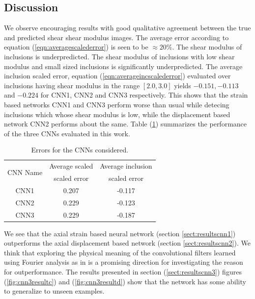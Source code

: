 \documentclass[12pt]{article}
\begin{document}
\subsection{\label{sect:discussion}Discussion}
We observe encouraging results with good qualitative agreement between the true and predicted shear shear modulus images. The average error according to equation (\ref{eqn:averagescalederror}) is seen to be $\approx{20\%}$. The shear modulus of inclusions is underpredicted. The shear modulus of inclusions with low shear modulus and small sized inclusions is significantly underpredicted. The average inclusion scaled error, equation (\ref{eqn:averageincscalederror}) evaluated over inclusions having shear modulus in the range $[2.0,3.0]$ yields $-0.151,-0.113$ and $-0.224$ for CNN1, CNN2 and CNN3 respectively. This shows that the strain based networks CNN1 and CNN3 perform worse than usual while detecing inclusions which whose shear modulus is low, while the displacement based network CNN2 performs about the same. Table (\ref{table:cnnstatsummary}) summarizes the performance of the three CNNs evaluated in this work. 


\begin{table}
  \centering
  \begin{tabular}{|c|c|c|}
    \hline
    \multirow{2}{*}{CNN Name} & Average scaled & Average inclusion \\
                              & scaled error   & scaled error      \\
    \hline
    CNN1     & 0.207 & -0.117\\
    \hline
    CNN2     & 0.229 & -0.123\\
    \hline
    CNN3     & 0.229 & -0.187\\
    \hline
  \end{tabular}
  \caption{\label{table:cnnstatsummary} Errors for the CNNs considered.}
\end{table}  

We see that the axial strain based neural network (section {\ref{sect:resultscnn1}}) outperforms the axial displacement based network (section \ref{sect:resultscnn2}). We think that exploring the physical meaning of the convolutional filters learned using Fourier analysis as in \cite{paper:pateloberai2019} is a promising direction for investigating the reason for outperformance. The results presented in section (\ref{sect:resultscnn3}) figures (\ref{fig:cnn3resultc}) and (\ref{fig:cnn3resultd}) show that the network has some ability to generalize to unseen examples.
%
\end{document}
